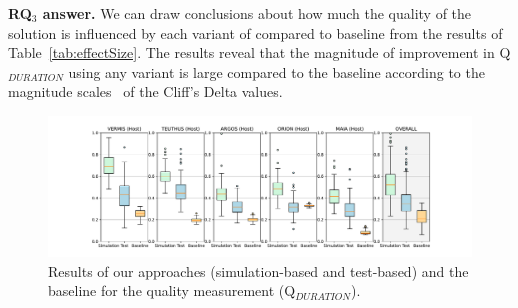 \textbf{RQ$_3$ answer. }
We can draw conclusions about how much the quality of the solution is influenced by each variant of \ApproachName{} compared to baseline from the results of Table~\ref{tab:effectSize}. The results reveal that the magnitude of improvement in Q$_{DURATION}$ using any variant is large compared to the baseline according to the magnitude scales~\cite{Romano2006} of the Cliff's Delta values.


\begin{figure}[ht!]
    \centering
    \includegraphics[width=\textwidth]{Figures/Imhotep_with_legend_and_oracle_average-v4.pdf}
    \caption{Results of our \ApproachName{} approaches (simulation-based and test-based) and the baseline for the quality measurement (Q$_{DURATION}$).}
    \label{fig:results}
\end{figure}






